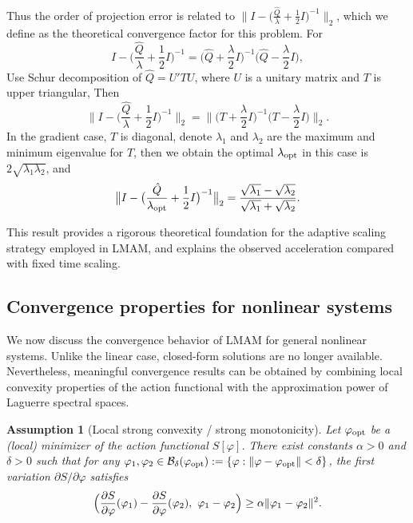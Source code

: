 \documentclass[a4paper,fleqn, 12pt]{cas-sc}
\newtheorem{assumption}{Assumption}
\numberwithin{table}{section}
\begin{document}
Thus the order of projection error is related to $\left. \bigl\| I - \bigl(
	\frac{\hat{Q}}{\lambda} + \frac{1}{2} I \bigr)^{- 1} \right. \bigr\|_2 $, which we define as the theoretical 
	convergence factor for this problem.
	For
	\[ I - \bigl( \frac{\hat{Q}}{\lambda} + \frac{1}{2} I \bigr)^{- 1} = \bigl(
	\hat{Q} + \frac{\lambda}{2} I \bigr)^{- 1} \bigl( \hat{Q} -
	\frac{\lambda}{2} I \bigr), \]
	Use Schur decomposition of $\hat{Q} = U' T U$, where $U$ is a unitary matrix
	and $T$ is upper triangular, Then
    \begin{equation}\label{eq:linear_conv_factor_nongrad}
       \bigl\| I - \bigl( \frac{\hat{Q}}{\lambda} + \frac{1}{2} I \bigr)^{- 1}
	 \bigr\|_2 = \bigl\| \bigl( T + \frac{\lambda}{2} I \bigr)^{- 1} \bigl(
	T - \frac{\lambda}{2} I \bigr) \bigr\|_2 . 
    \end{equation}
	In the gradient case, $T$ is diagonal, denote $\lambda_1 $ and $\lambda_2 $
	are the maximum and minimum eigenvalue for $T$, then we obtain the optimal 
	$\lambda_{{\rm opt}} $ in this case is $2\sqrt{\lambda_1 \lambda_2 }$, and
    \begin{equation}
        \label{eq:linear_conv_factor_grad}
        \bigl\| I - \bigl( \frac{\hat{Q}}{\lambda_{{\rm opt}} } + \frac{1}{2} I
	\bigr)^{- 1} \bigr\|_2 = \frac{ \sqrt{\lambda_1} -
		\sqrt{\lambda_2}}{\sqrt{\lambda_1} + \sqrt{\lambda_2}}. 
    \end{equation}

This result provides a rigorous theoretical foundation for the adaptive scaling strategy employed in
LMAM, and explains the observed acceleration compared with fixed time scaling.

\subsection{Convergence properties for nonlinear systems}

We now discuss the convergence behavior of LMAM for general nonlinear systems.
Unlike the linear case, closed-form solutions are no longer available.
Nevertheless, meaningful convergence results can be obtained by combining local convexity
properties of the action functional with the approximation power of Laguerre spectral spaces.

\begin{assumption}[Local strong convexity / strong monotonicity]
\label{ass:local_strong_convex}
Let $\varphi_{\rm opt}$ be a (local) minimizer of the action functional $S[\varphi]$.
There exist constants $\alpha>0$ and $\delta>0$ such that for any
$\varphi_1,\varphi_2\in \mathcal{B}_\delta(\varphi_{\rm opt})
:=\{\varphi:\|\varphi-\varphi_{\rm opt}\|<\delta\}$,
the first variation $\partial S/\partial\varphi$ satisfies
\begin{equation}
\label{eq:strong_mono}
\Bigl(
\frac{\partial S}{\partial \varphi}(\varphi_1)
-\frac{\partial S}{\partial \varphi}(\varphi_2),
\ \varphi_1-\varphi_2
\Bigr)
\ge \alpha \|\varphi_1-\varphi_2\|^2 .
\end{equation}
\end{assumption}
\end{document}
